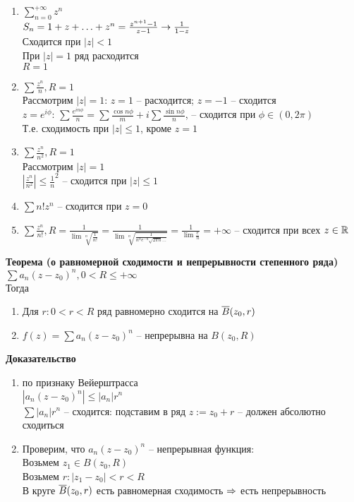 \documentclass[12pt]{article}
\begin{document}
\begin{enumerate}
    \item $\sum_{n=0}^{+\infty} z^n$\\
    $S_n = 1 + z + \ldots + z^n = \frac{z^{n+1}-1}{z-1} \rightarrow \frac1{1-z}$\\
    Сходится при $|z| < 1$\\
    При $|z| = 1$ ряд расходится\\
    $R=1$
    \item $\sum \frac{z^n}n, R = 1$\\
    Рассмотрим $|z| = 1$: $z=1$ -- расходится; $z=-1$ -- сходится\\
    $z=e^{i\phi}$: $\sum \frac{e^{in\phi}}{n} = \sum \frac{\cos n\phi}{m} + i\sum \frac{\sin n\phi}{n}$, -- сходится при $\phi \in(0, 2\pi)$\\
    Т.е. сходимость при $|z| \leq 1$, кроме $z=1$
    \item $\sum \frac{z^n}{n^2}, R = 1$\\
    Рассмотрим $|z|=1$\\
    $|\frac{z^n}{n^2}| \leq \frac1n^2$ -- сходится при $|z| \leq 1$
    \item $\sum n!z^n$ -- сходится при $z=0$
    \item $\sum \frac{z^n}{n!}, R = \frac1{\lim \sqrt[n]{\frac1{n!}}} = \frac1{\lim \sqrt[n]{\frac1{n^n e^{-n}\sqrt{2\pi n}\ldots}}} = \frac1{\lim \frac en} = +\infty$ -- сходится при всех $z \in \mathbb{R}$
\end{enumerate}
\textbf{Теорема (о равномерной сходимости и непрерывности степенного ряда)}\\
$\sum a_n (z-z_0)^n, 0 < R \leq +\infty$\\
Тогда \begin{enumerate}
    \item Для $r: 0 < r < R$ ряд равномерно сходится на $\overline B (z_0, r)$
    \item $f(z) = \sum a_n(z-z_0)^n$ -- непрерывна на $B(z_0, R)$
\end{enumerate}
\textbf{Доказательство}
\begin{enumerate}
    \item по признаку Вейерштрасса\\
    $|a_n(z-z_0)^n| \leq |a_n|r^n$\\
    $\sum |a_n|r^n$ -- сходится: подставим в ряд $z:=z_0+r$ -- должен абсолютно сходиться
    \item Проверим, что $a_n(z-z_0)^n$ -- непрерывная функция:\\
    Возьмем $z_1 \in B(z_0, R)$\\
    Возьмем $r: |z_1-z_0| < r < R$\\
    В круге $\overline B(z_0, r)$ есть равномерная сходимость $\Rightarrow$ есть непрерывность
\end{enumerate}
\end{document}
